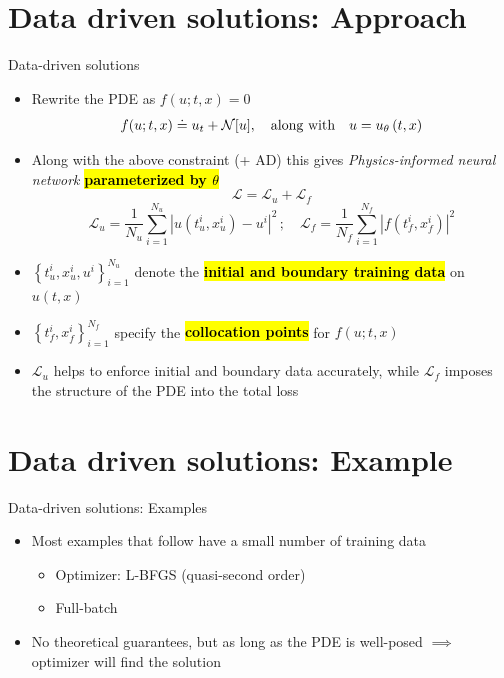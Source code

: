 \documentclass[xcolor=dvipsnames,10pt]{beamer}
\makeatletter
\let\HL\hl
\renewcommand\hl{%
  \let\set@color\beamerorig@set@color
  \let\reset@color\beamerorig@reset@color
  \HL}
\makeatother
\begin{document}
\section{Data driven solutions: Approach}
\begin{frame}[t]{Data-driven solutions}
  \begin{itemize}
    \item<1-> Rewrite the PDE as $f(u; t,x) = 0$
    $$
      f(u; t,x) \doteq u_{t}+\mathcal{N}[u], \quad \text{along with}\quad u = u_\theta \lr{t, x}
      \vspace*{-2ex}
      $$\vspace*{-2ex}
    \item<2-> Along with the above constraint (+ AD) this gives \emph{Physics-informed neural network} \hl{\bf parameterized by $\theta$}
    $$
      \mathcal{L}=\mathcal{L}_{u}+\mathcal{L}_{f}
    $$
    $$
      \mathcal{L}_{u}=\frac{1}{N_{u}} \sum_{i=1}^{N_{u}}\left|u\left(t_{u}^{i}, x_{u}^{i}\right)-u^{i}\right|^{2}\, ;\quad \mathcal{L}_{f}=\frac{1}{N_{f}} \sum_{i=1}^{N_{f}}\left|f\left(t_{f}^{i}, x_{f}^{i}\right)\right|^{2}
    $$
    \item<3-> $\left\{t_{u}^{i}, x_{u}^{i}, u^{i}\right\}_{i=1}^{N_{u}}$ denote the \hl{\bf initial and boundary training data} on $u(t, x)$
    \item<4-> $\left\{t_{f}^{i}, x_{f}^{i}\right\}_{i=1}^{N_{f}}$ specify the \hl{\bf collocation points}
    for $f(u;t,x)$
    \item<5-> $\mathcal{L}_u$ helps to enforce initial and boundary data accurately, while $\mathcal{L}_f$ imposes the structure of the PDE into the total loss
  \end{itemize}
\end{frame}
\section{Data driven solutions: Example}
\begin{frame}[t]{Data-driven solutions: Examples}
  \begin{itemize}
    \item<1-> Most examples that follow have a small number of training data
    \begin{itemize}
      \item<2-> Optimizer: L-BFGS (quasi-second order)
      \item<3-> Full-batch
    \end{itemize}
    \item<4-> No theoretical guarantees, but as long as the PDE is well-posed $\implies$ optimizer will find the solution
  \end{itemize}
\end{frame}
\end{document}
